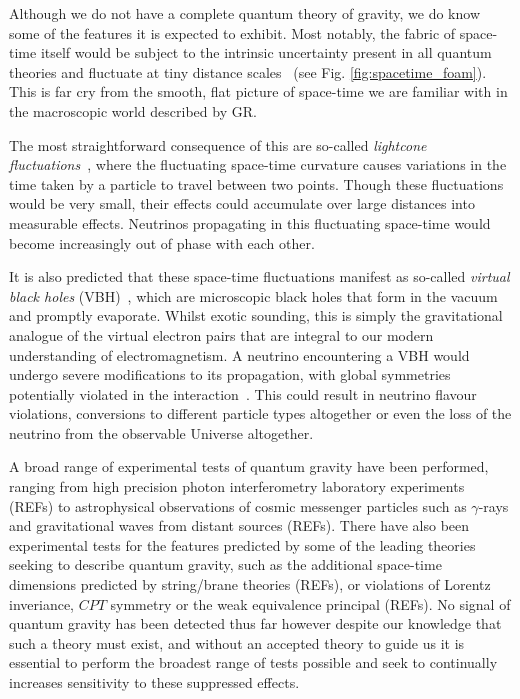 \documentclass[a4paper,11pt]{article}
\begin{document}
Although we do not have a complete quantum theory of gravity, we do know some of the features it is expected to exhibit. Most notably, the fabric of space-time itself would be subject to the intrinsic uncertainty present in all quantum theories and fluctuate at tiny distance scales~\cite{PhysRev.97.511, Hawking} (see Fig. \ref{fig:spacetime_foam}). This is far cry from the smooth, flat picture of space-time we are familiar with in the macroscopic world described by GR. 

The most straightforward consequence of this are so-called \textit{lightcone fluctuations}~\cite{PauliLightcone, Ford1999, gr-qc/9909085}, where the fluctuating space-time curvature causes variations in the time taken by a particle to travel between two points. Though these fluctuations would be very small, their effects could accumulate over large distances into measurable effects. Neutrinos propagating in this fluctuating space-time would become increasingly out of phase with each other.

It is also predicted that these space-time fluctuations manifest as so-called \textit{virtual black holes} (VBH)~\cite{Hawking1982,PhysRevD.53.3099}, which are microscopic black holes that form in the vacuum and promptly evaporate. Whilst exotic sounding, this is simply the gravitational analogue of the virtual electron pairs that are integral to our modern understanding of electromagnetism. A neutrino encountering a VBH would undergo severe modifications to its propagation, with global symmetries potentially violated in the interaction~\cite{Anchordoqui:2005gj, PhysRevD.102.115003, Hellmann:2021jyz}. This could result in neutrino flavour violations, conversions to different particle types altogether or even the loss of the neutrino from the observable Universe altogether.

A broad range of experimental tests of quantum gravity have been performed, ranging from high precision photon interferometry laboratory experiments (REFs) to astrophysical observations of cosmic messenger particles such as $\gamma$-rays and gravitational waves from distant sources (REFs). There have also been experimental tests for the features predicted by some of the leading theories seeking to describe quantum gravity, such as the additional space-time dimensions predicted by string/brane theories (REFs), or violations of Lorentz inveriance, $CPT$ symmetry or the weak equivalence principal (REFs). No signal of quantum gravity has been detected thus far however despite our knowledge that such a theory must exist, and without an accepted theory to guide us it is essential to perform the broadest range of tests possible and seek to continually increases sensitivity to these suppressed effects. \\
\end{document}
